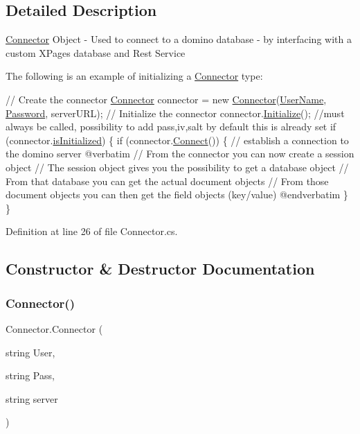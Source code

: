 \subsection{Detailed Description}
\hyperlink{class_connector}{Connector} Object -\/ Used to connect to a domino database -\/ by interfacing with a custom X\+Pages database and Rest Service 

The following is an example of initializing a {\ttfamily \hyperlink{class_connector}{Connector}} type\+: 
\begin{DoxyCode}
    \textcolor{comment}{// Create the connector}
    \hyperlink{class_connector}{Connector} connector = \textcolor{keyword}{new} \hyperlink{class_connector_a259c6d94252479cc3028038ebbaa7dc8}{Connector}(\hyperlink{class_connector_a41d247f09774f0ed206ce1a4a2463fed}{UserName}, 
      \hyperlink{class_connector_a7dd469898462ef761d256392766461fe}{Password}, serverURL);
    \textcolor{comment}{// Initialize the connector}
    connector.\hyperlink{class_connector_a2ceb19719cfc04adc4c2d299e19e1447}{Initialize}();
    \textcolor{comment}{//must always be called, possibility to add pass,iv,salt by default this is already set}
    \textcolor{keywordflow}{if} (connector.\hyperlink{class_connector_a017d40b1f4cf2cbaa5d4b755cf09269e}{isInitialized}) \{
        \textcolor{keywordflow}{if} (connector.\hyperlink{class_connector_a0dcf8f969c37c4306c567417a872329a}{Connect}()) \{  \textcolor{comment}{// establish a connection to the domino server}
@verbatim
\textcolor{comment}{// From the connector you can now create a session object}
\textcolor{comment}{// The session object gives you the possibility to get a database object}
\textcolor{comment}{// From that database you can get the actual document objects}
\textcolor{comment}{// From those document objects you can then get the field objects (key/value)}
\textcolor{keyword}{@end}verbatim
        \}   
    \}
\end{DoxyCode}
 

Definition at line 26 of file Connector.\+cs.



\subsection{Constructor \& Destructor Documentation}
\mbox{\label{class_connector_a259c6d94252479cc3028038ebbaa7dc8}} 
\subsubsection{\texorpdfstring{Connector()}{Connector()}}
{\footnotesize\ttfamily Connector.\+Connector (\begin{DoxyParamCaption}\item[{string}]{User,  }\item[{string}]{Pass,  }\item[{string}]{server }\end{DoxyParamCaption})}



